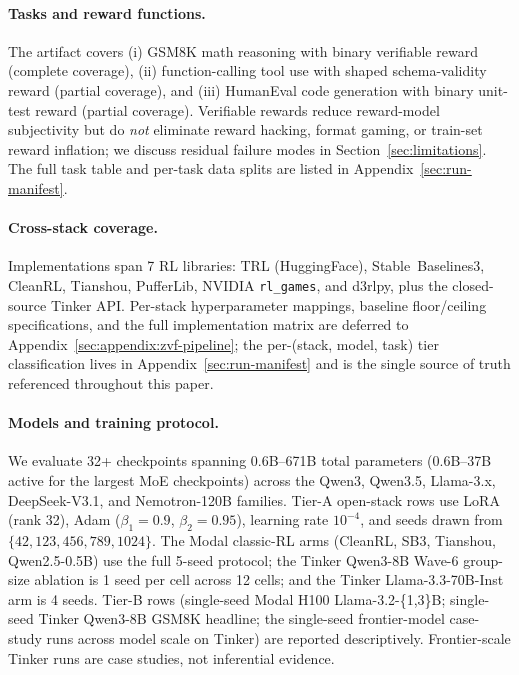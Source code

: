 \documentclass{article}
\begin{document}
\paragraph{Tasks and reward functions.}
The artifact covers (i) GSM8K math reasoning with binary verifiable reward
(complete coverage), (ii) function-calling tool use with shaped
schema-validity reward (partial coverage), and (iii) HumanEval code
generation with binary unit-test reward (partial coverage). Verifiable
rewards reduce reward-model subjectivity but do \emph{not} eliminate
reward hacking, format gaming, or train-set reward inflation; we discuss
residual failure modes in Section~\ref{sec:limitations}. The full task
table and per-task data splits are listed in
Appendix~\ref{sec:run-manifest}.

\paragraph{Cross-stack coverage.}
Implementations span 7 RL libraries: TRL (HuggingFace),
Stable~Baselines3, CleanRL, Tianshou, PufferLib, NVIDIA \texttt{rl\_games},
and d3rlpy, plus the closed-source Tinker API. Per-stack
hyperparameter mappings, baseline floor/ceiling specifications, and the
full implementation matrix are deferred to
Appendix~\ref{sec:appendix:zvf-pipeline}; the per-(stack, model, task)
tier classification lives in Appendix~\ref{sec:run-manifest} and is the
single source of truth referenced throughout this paper.

\paragraph{Models and training protocol.}
We evaluate 32+ checkpoints spanning 0.6B--671B total parameters
(0.6B--37B active for the largest MoE checkpoints) across the Qwen3,
Qwen3.5, Llama-3.x, DeepSeek-V3.1, and Nemotron-120B families.
Tier-A open-stack rows use LoRA (rank 32), Adam ($\beta_1{=}0.9$,
$\beta_2{=}0.95$), learning rate $10^{-4}$, and seeds drawn from
$\{42,123,456,789,1024\}$. The Modal classic-RL arms (CleanRL, SB3,
Tianshou, Qwen2.5-0.5B) use the full 5-seed protocol; the Tinker Qwen3-8B
Wave-6 group-size ablation is 1 seed per cell across 12 cells; and the
Tinker Llama-3.3-70B-Inst arm is 4 seeds. Tier-B rows (single-seed Modal
H100 Llama-3.2-\{1,3\}B; single-seed Tinker Qwen3-8B GSM8K headline; the
single-seed frontier-model case-study runs across model scale on Tinker)
are reported descriptively. Frontier-scale Tinker runs are case studies,
not inferential evidence.
\end{document}
